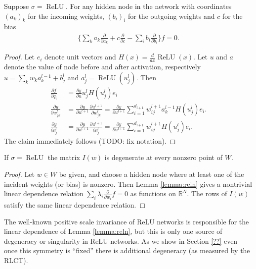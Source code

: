 \documentclass{article} %
\begin{document}
\begin{lemma}\label{lemma:reln} Suppose $\sigma = \operatorname{ReLU}$. For any hidden node in the network with coordinates $(a_k)_k$ for the incoming weights, $(b_i)_i$ for the outgoing weights and $c$ for the bias
\begin{align*}
\Big\{ \sum_k a_{k}\frac{\partial}{\partial a_k} + c \frac{\partial}{\partial c}-\sum_{i} b_i\frac{\partial}{\partial b_i} \Big\} f = 0.
\end{align*}
\end{lemma}
\begin{proof}
Let $e_i$ denote unit vectors and $H(x)=\frac{d}{dx}\operatorname{ReLU}(x)$. Let $u$ and $a$ denote the value of node before and after activation, respectively $u =\sum_k w_k a_{k}^{l-1}+b_{j}^{l}$ and $a_{j}^{l} =\operatorname{ReLU}(u_{j}^{l})$. Then
\begin{align*}
\frac{\partial f}{\partial q_i}&=\frac{\partial y}{\partial u}u_{j}^{l}H(u_{j}^{l})e_{i}\\
\frac{\partial y}{\partial w_{jk}^{l}}&=\frac{\partial y}{\partial u^{l+1}}\frac{\partial u^{l+1}}{\partial w_{jk}^{l}}=\frac{\partial y}{\partial u^{l+1}}\sum_{i=1}^{d_{l+1}}w_{ij}^{l+1}a_{k}^{l-1}H(u_{j}^{l})e_{i}.\\
\frac{\partial y}{\partial b_{j}^{l}}&=\frac{\partial y}{\partial u^{l+1}}\frac{\partial u^{l+1}}{\partial b_{j}^{l}}=\frac{\partial y}{\partial u^{l+1}}\sum_{i=1}^{d_{l+1}}w_{ij}^{l+1}H(u_{j}^{l})e_{i}.
\end{align*}
The claim immediately follows (TODO: fix notation).
\end{proof}

\begin{lemma} If $\sigma = \operatorname{ReLU}$ the matrix $I(w)$ is degenerate at every nonzero point of $W$.
\end{lemma}
\begin{proof}
Let $w \in W$ be given, and choose a hidden node where at least one of the incident weights (or bias) is nonzero. Then Lemma \ref{lemma:reln} gives a nontrivial linear dependence relation $\sum_i \lambda_i \frac{\partial}{\partial w_i} f = 0$ as functions on $\mathbb{R}^N$. The rows of $I(w)$ satisfy the same linear dependence relation.
\end{proof}

The well-known positive scale invariance of ReLU networks is responsible for the linear dependence of Lemma \ref{lemma:reln}, but this is only one source of degeneracy or singularity in ReLU networks. As we show in Section \ref{??} even once this symmetry is ``fixed'' there is additional degeneracy (as measured by the RLCT).
\end{document}
